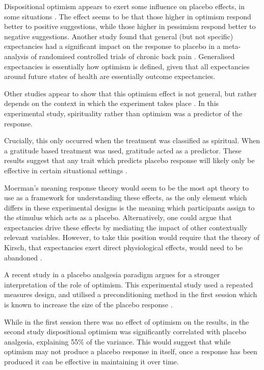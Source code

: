 Dispositional optimism appears to exert some influence on placebo effects, in some situations \cite{Geers2005,morton2009reproducibility}. The effect seems to be that those higher in optimism respond better to positive suggestions, while those higher in pessimism respond better to negative suggestions. Another study found that general (but not specific) expectancies had a significant impact on the response to placebo in a meta-analysis of randomised controlled trials of chronic back pain \cite{myers2008patient}. Generalised expectancies is essentially how optimism is defined, given that all expectancies around future states of health are essentially outcome expectancies. 

Other studies appear to  show that this optimism effect is not general, but rather depends on the context in which the experiment takes place \cite{Hyland2006}. In this experimental study, spirituality rather than optimism was a predictor of the response.  

Crucially, this only occurred when the treatment was classified as spiritual. When a gratitude based treatment was used, gratitude acted as a predictor. These results suggest that any trait which predicts placebo response will likely only be effective in certain situational settings \cite{Kaptchuk2008a}. 

Moerman's meaning response theory would seem to be the most apt theory to use as a framework for understanding these effects, as the only element which differs in these experimental designs is the meaning which participants assign to the stimulus which acts as a placebo. Alternatively, one could argue that expectancies drive these effects by mediating the impact of other contextually relevant variables. However, to take this position would require that the theory of Kirsch, that expectancies exert direct physiological effects, would need to be abandoned \cite{Kirsch1985}.  

A recent study \cite{morton2009reproducibility} in a placebo analgesia paradigm argues for a stronger interpretation of the role of optimism. This experimental study used a repeated measures design, and utilised a preconditioning method in the first session which is known to increase the size of the placebo response \cite{Voudouris1985}. 

While in the first session there was no effect of optimism on the results, in the second study dispositional optimism was significantly correlated with placebo analgesia, explaining 55\% of the variance. This would suggest that while optimism may not produce a placebo response in itself, once a response has been produced it can be effective in maintaining it over time. 

